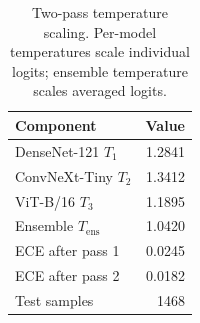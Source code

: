 \begin{table}[htbp]
  \centering
  \small
  \caption{Two-pass temperature scaling. Per-model temperatures scale individual logits; ensemble temperature scales averaged logits.}
  \label{tab:calibration-detail}
  \begin{tabular}{lr}
    \toprule
    \textbf{Component} & \textbf{Value} \\
    \midrule
    DenseNet-121 $T_1$ & 1.2841 \\
    ConvNeXt-Tiny $T_2$ & 1.3412 \\
    ViT-B/16 $T_3$ & 1.1895 \\
    Ensemble $T_\text{ens}$ & 1.0420 \\
    ECE after pass 1 & 0.0245 \\
    ECE after pass 2 & 0.0182 \\
    Test samples & 1468 \\
    \bottomrule
  \end{tabular}
\end{table}
